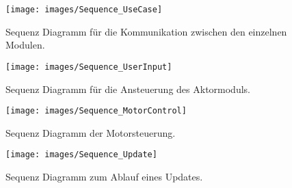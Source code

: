 \begin{figure}[hbt]
	\centering
	\texttt{[image: images/Sequence\_UseCase]}
	\caption[Sequence UseCase]{Sequenz Diagramm für die Kommunikation zwischen den einzelnen Modulen.}
	\label{fig:Sequence_UseCase}
\end{figure}

\begin{figure}[hbt]
	\centering
	\texttt{[image: images/Sequence\_UserInput]}
	\caption[Sequence UserInput]{Sequenz Diagramm für die Ansteuerung des Aktormoduls.}
	\label{fig:Sequence_UserInput}
\end{figure}

\begin{figure}[hbt]
	\centering
	\texttt{[image: images/Sequence\_MotorControl]}
	\caption[Sequence Diagramm MotorControl]{Sequenz Diagramm der Motorsteuerung.}
	\label{fig:SequenceMotorControl}
\end{figure}

\begin{figure}[hbt]
	\centering
	\texttt{[image: images/Sequence\_Update]}
	\caption[Sequence Update]{Sequenz Diagramm zum Ablauf eines Updates.}
	\label{fig:Sequence_Update}
\end{figure}
